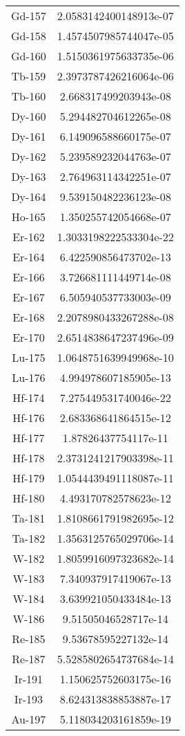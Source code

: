 \begin{table}[h!]
\begin{tabular}{|| c || c |}
Gd-157 & 2.0583142400148913e-07 \\
Gd-158 & 1.4574507985744047e-05 \\
Gd-160 & 1.5150361975633735e-06 \\
Tb-159 & 2.3973787426216064e-06 \\
Tb-160 & 2.668317499203943e-08 \\
Dy-160 & 5.294482704612265e-08 \\
Dy-161 & 6.149096588660175e-07 \\
Dy-162 & 5.239589232044763e-07 \\
Dy-163 & 2.764963114342251e-07 \\
Dy-164 & 9.539150482236123e-08 \\
Ho-165 & 1.350255742054668e-07 \\
Er-162 & 1.3033198222533304e-22 \\
Er-164 & 6.422590856473702e-13 \\
Er-166 & 3.726681111449714e-08 \\
Er-167 & 6.505940537733003e-09 \\
Er-168 & 2.2078980433267288e-08 \\
Er-170 & 2.6514838647237496e-09 \\
Lu-175 & 1.0648751639949968e-10 \\
Lu-176 & 4.994978607185905e-13 \\
Hf-174 & 7.275449531740046e-22 \\
Hf-176 & 2.683368641864515e-12 \\
Hf-177 & 1.87826437754117e-11 \\
Hf-178 & 2.3731241217903398e-11 \\
Hf-179 & 1.0544439491118087e-11 \\
Hf-180 & 4.493170782578623e-12 \\
Ta-181 & 1.8108661791982695e-12 \\
Ta-182 & 1.3563125765029706e-14 \\
W-182 & 1.8059916097323682e-14 \\
W-183 & 7.340937917419067e-13 \\
W-184 & 3.639921050433484e-13 \\
W-186 & 9.51505046528717e-14 \\
Re-185 & 9.53678595227132e-14 \\
Re-187 & 5.5285802654737684e-14 \\
Ir-191 & 1.150625752603175e-16 \\
Ir-193 & 8.624313838853887e-17 \\
Au-197 & 5.118034203161859e-19 \\

\end{tabular}
\end{table}
